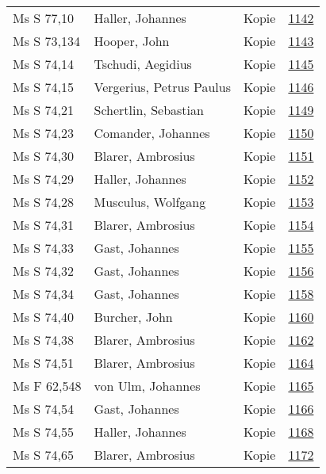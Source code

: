 \documentclass[10pt,a4paper,landscape]{report}
\begin{document}
\begin{longtable}{p{16cm}p{4cm}lr}
Ms S 77,10	&	Haller, Johannes	&	Kopie	&	\href{http://130.60.24.72/assignment/1142}{1142}\\
Ms S 73,134	&	Hooper, John	&	Kopie	&	\href{http://130.60.24.72/assignment/1143}{1143}\\
Ms S 74,14	&	Tschudi, Aegidius	&	Kopie	&	\href{http://130.60.24.72/assignment/1145}{1145}\\
Ms S 74,15	&	Vergerius, Petrus Paulus	&	Kopie	&	\href{http://130.60.24.72/assignment/1146}{1146}\\
Ms S 74,21	&	Schertlin, Sebastian	&	Kopie	&	\href{http://130.60.24.72/assignment/1149}{1149}\\
Ms S 74,23	&	Comander, Johannes	&	Kopie	&	\href{http://130.60.24.72/assignment/1150}{1150}\\
Ms S 74,30	&	Blarer, Ambrosius	&	Kopie	&	\href{http://130.60.24.72/assignment/1151}{1151}\\
Ms S 74,29	&	Haller, Johannes	&	Kopie	&	\href{http://130.60.24.72/assignment/1152}{1152}\\
Ms S 74,28	&	Musculus, Wolfgang	&	Kopie	&	\href{http://130.60.24.72/assignment/1153}{1153}\\
Ms S 74,31	&	Blarer, Ambrosius	&	Kopie	&	\href{http://130.60.24.72/assignment/1154}{1154}\\
Ms S 74,33	&	Gast, Johannes	&	Kopie	&	\href{http://130.60.24.72/assignment/1155}{1155}\\
Ms S 74,32	&	Gast, Johannes	&	Kopie	&	\href{http://130.60.24.72/assignment/1156}{1156}\\
Ms S 74,34	&	Gast, Johannes	&	Kopie	&	\href{http://130.60.24.72/assignment/1158}{1158}\\
Ms S 74,40	&	Burcher, John	&	Kopie	&	\href{http://130.60.24.72/assignment/1160}{1160}\\
Ms S 74,38	&	Blarer, Ambrosius	&	Kopie	&	\href{http://130.60.24.72/assignment/1162}{1162}\\
Ms S 74,51	&	Blarer, Ambrosius	&	Kopie	&	\href{http://130.60.24.72/assignment/1164}{1164}\\
Ms F 62,548	&	von Ulm, Johannes	&	Kopie	&	\href{http://130.60.24.72/assignment/1165}{1165}\\
Ms S 74,54	&	Gast, Johannes	&	Kopie	&	\href{http://130.60.24.72/assignment/1166}{1166}\\
Ms S 74,55	&	Haller, Johannes	&	Kopie	&	\href{http://130.60.24.72/assignment/1168}{1168}\\
Ms S 74,65	&	Blarer, Ambrosius	&	Kopie	&	\href{http://130.60.24.72/assignment/1172}{1172}\\

\end{longtable}
\end{document}
